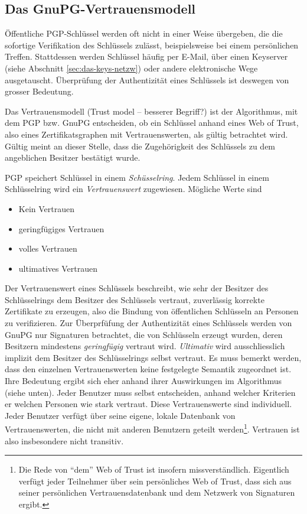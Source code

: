 \subsection{Das GnuPG-Vertrauensmodell}
\label{sec:das-gnupg-vertrauensmodell}

Öffentliche PGP-Schlüssel werden oft nicht in einer Weise übergeben,
die die sofortige Verifikation des Schlüssels zulässt, beispielsweise
bei einem persönlichen Treffen. Stattdessen werden Schlüssel häufig
per E-Mail, über einen Keyserver (siehe Abschnitt
\ref{sec:das-keys-netzw}) oder andere elektronische Wege ausgetauscht.
Überprüfung der Authentizität eines Schlüssels ist deswegen von
grosser Bedeutung.

Das Vertrauensmodell (Trust model -- besserer Begriff?) ist der
Algorithmus, mit dem PGP bzw. GnuPG entscheiden, ob ein Schl\"ussel
anhand eines Web of Trust, also eines Zertifikatsgraphen mit
Vertrauenswerten, als g\"ultig betrachtet wird. G\"ultig meint an
dieser Stelle, dass die Zugeh\"origkeit des Schl\"ussels zu dem
angeblichen Besitzer best\"atigt wurde.

PGP speichert Schl\"ussel in einem \emph{Sch\"usselring}. Jedem
Schl\"ussel in einem Schl\"usselring wird ein \emph{Vertrauenswert}
zugewiesen. M\"ogliche Werte sind
\begin{itemize}
\item Kein Vertrauen
\item geringf\"ugiges Vertrauen
\item volles Vertrauen
\item ultimatives Vertrauen
\end{itemize}
Der Vertrauenswert eines Schl\"ussels beschreibt, wie sehr der
Besitzer des Schl\"usselrings dem Besitzer des Schl\"ussels vertraut,
zuverl\"assig korrekte Zertifikate zu erzeugen, also die Bindung von
\"offentlichen Schl\"usseln an Personen zu verifizieren.  Zur
\"Uberprf\"ufung der Authentizit\"at eines Schl\"ussels werden von
GnuPG nur Signaturen betrachtet, die von Schl\"usseln erzeugt wurden,
deren Besitzern mindestens \emph{geringf\"ugig} vertraut
wird. \emph{Ultimativ} wird ausschliesslich implizit dem Besitzer des
Schl\"usselrings selbst vertraut. Es muss bemerkt werden, dass den
einzelnen Vertrauenswerten keine festgelegte Semantik zugeordnet
ist. Ihre Bedeutung ergibt sich eher anhand ihrer Auswirkungen im
Algorithmus (siehe unten). Jeder Benutzer muss selbst entscheiden,
anhand welcher Kriterien er welchen Personen wie stark vertraut. Diese
Vertrauenswerte sind individuell. Jeder Benutzer verf\"ugt \"uber
seine eigene, lokale Datenbank von Vertrauenswerten, die nicht mit
anderen Benutzern geteilt werden\footnote{Die Rede von ``dem'' Web of
  Trust ist insofern missverst\"andlich. Eigentlich verf\"ugt jeder
  Teilnehmer \"uber sein pers\"onliches Web of Trust, dass sich aus
  seiner pers\"onlichen Vertrauensdatenbank und dem Netzwerk von
  Signaturen ergibt.}. Vertrauen ist also insbesondere nicht
transitiv.

